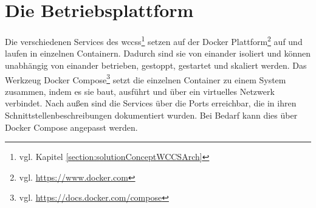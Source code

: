 \section{Die Betriebsplattform}
    Die verschiedenen Services des
    \glspl{wccs}\footnote{vgl. Kapitel \ref{section:solutionConceptWCCSArch}}
    setzen auf der Docker Plattform\footnote{vgl. \url{https://www.docker.com}} auf
    und laufen in einzelnen Containern.
    Dadurch sind sie von einander isoliert und können unabhängig von einander
    betrieben, gestoppt, gestartet und skaliert werden.
    Das Werkzeug Docker Compose\footnote{vgl. \url{https://docs.docker.com/compose}}
    setzt die einzelnen Container zu einem System zusammen,
    indem es sie baut, ausführt und über ein virtuelles Netzwerk verbindet.
    Nach außen sind die Services über die Ports erreichbar,
    die in ihren Schnittstellenbeschreibungen dokumentiert wurden.
    Bei Bedarf kann dies über Docker Compose angepasst werden.
